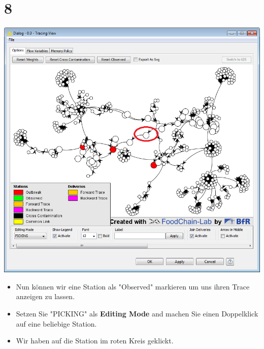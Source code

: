 \documentclass{beamer}
\begin{document}
\section{8}
\begin{frame}
	\begin{center}
  		\includegraphics[height=0.6\textheight]{8.png}
	\end{center}
	\begin{itemize}
		\item Nun können wir eine Station als "Observed" markieren um uns ihren Trace anzeigen zu lassen.
		\item Setzen Sie "PICKING" als \textbf{Editing Mode} and machen Sie einen Doppelklick auf eine beliebige Station.
		\item Wir haben auf die Station im roten Kreis geklickt.
	\end{itemize}
\end{frame}
\end{document}
